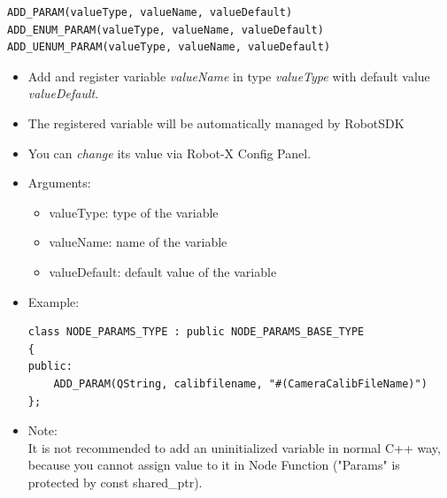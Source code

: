 \documentclass[a4paper,10pt]{book}
\begin{document}
\begin{mdframed}
\begin{verbatim}
ADD_PARAM(valueType, valueName, valueDefault)
ADD_ENUM_PARAM(valueType, valueName, valueDefault)
ADD_UENUM_PARAM(valueType, valueName, valueDefault)
\end{verbatim}
\begin{itemize}
 \item Add and register variable {\em{valueName}} in type {\em{valueType}} with default value {\em{valueDefault}}.
 \item The registered variable will be automatically managed by RobotSDK
 \item You can {\em{change}} its value via Robot-X Config Panel.
 \item Arguments:
 \begin{itemize}
  \item valueType: type of the variable
  \item valueName: name of the variable
  \item valueDefault: default value of the variable
 \end{itemize}
 \item Example:
 \begin{verbatim}
class NODE_PARAMS_TYPE : public NODE_PARAMS_BASE_TYPE
{
public:
    ADD_PARAM(QString, calibfilename, "#(CameraCalibFileName)")
};
 \end{verbatim}
 \item Note: \\It is not recommended to add an uninitialized variable in normal C++ way, because you cannot assign value to it in Node Function ("Params" is protected by const shared\_ptr).
\end{itemize}
\end{mdframed}
\end{document}
